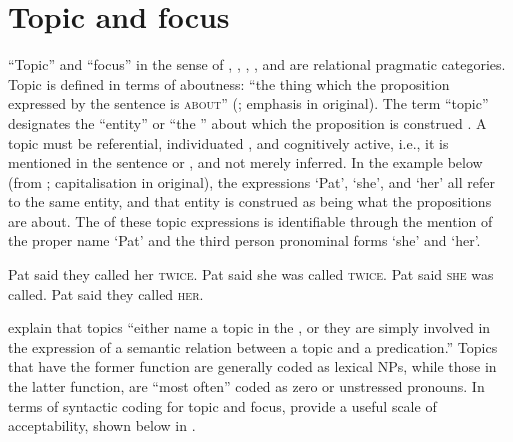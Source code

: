 \documentclass[output=paper
,modfonts
,nonflat]{langsci/langscibook}
\begin{document}
\section{\label{s:djenar:3}Topic and focus}

“Topic” and “focus” in the sense of \citet{Lambrecht1994}, \citet{Gundel1977}, \citet{Gundel1999}, \citet{Gundel2004}, and \citet{Gundel1993} are relational pragmatic categories. Topic is defined in terms of aboutness: “the thing which the proposition expressed by the sentence is \textsc{about}” (\citealt[118]{Lambrecht1994}; emphasis in original). The term “topic” designates the “entity” or “the  ” about which the proposition is construed \citep[127]{Lambrecht1994}. A topic must be referential, individuated \citep[187]{Gundel2004}, and cognitively active, i.e., it is mentioned in the sentence or , and not merely inferred. In the example below (from \citealt[127]{Lambrecht1994}; capitalisation in original), the expressions ‘Pat’, ‘she’, and ‘her’ all refer to the same entity, and that entity is construed as being what the propositions are about. The  of these topic expressions is identifiable through the mention of the proper name ‘Pat’ and the third person pronominal forms ‘she’ and ‘her’. 

\begin{exe}
	\ex\label{e:djenar:8}
	\begin{xlist}
		\ex Pat said they called her \textsc{twice}.
		\ex Pat said she was called \textsc{twice}.
		\ex Pat said \textsc{she} was called.
		\ex Pat said they called \textsc{her}. 
	\end{xlist}
\end{exe}

\noindent
\citet[204]{VanValin1997} explain that topics “either name a topic  in the , or they are simply involved in the expression of a semantic relation between a topic  and a predication.” Topics that have the former function are generally coded as lexical NPs, while those in the latter function, are “most often” coded as zero or unstressed pronouns. In terms of syntactic coding for topic and focus, \citet[205]{VanValin1997} provide a useful scale of acceptability, shown below in . 
\end{document}
